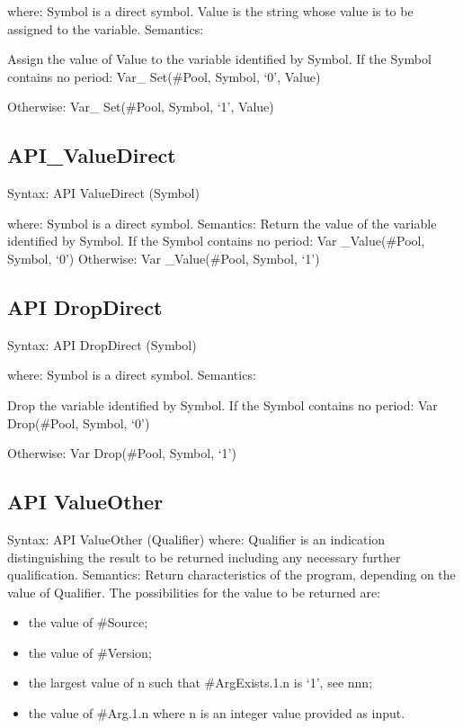 where: Symbol is a direct symbol. Value is the string whose value is to
be assigned to the variable. Semantics:

Assign the value of Value to the variable identified by Symbol. If the
Symbol contains no period: Var\_ Set(\#Pool, Symbol, `0', Value)

Otherwise: Var\_ Set(\#Pool, Symbol, `1', Value)

\hypertarget{api_valuedirect}{%
\subsection{API\_ValueDirect}\label{api_valuedirect}}

Syntax: API ValueDirect (Symbol)

where: Symbol is a direct symbol. Semantics: Return the value of the
variable identified by Symbol. If the Symbol contains no period: Var
\_Value(\#Pool, Symbol, `0') Otherwise: Var \_Value(\#Pool, Symbol, `1')

\hypertarget{api-dropdirect}{%
\subsection{API DropDirect}\label{api-dropdirect}}

Syntax: API DropDirect (Symbol)

where: Symbol is a direct symbol. Semantics:

Drop the variable identified by Symbol. If the Symbol contains no
period: Var Drop(\#Pool, Symbol, `0')

Otherwise: Var Drop(\#Pool, Symbol, `1')

\hypertarget{api-valueother}{%
\subsection{API ValueOther}\label{api-valueother}}

Syntax: API ValueOther (Qualifier) where: Qualifier is an indication
distinguishing the result to be returned including any necessary further
qualification. Semantics: Return characteristics of the program,
depending on the value of Qualifier. The possibilities for the value to
be returned are:

\begin{itemize}
\item
  the value of \#Source;
\item
  the value of \#Version;
\item
  the largest value of n such that \#ArgExists.1.n is `1', see nnn;
\item
  the value of \#Arg.1.n where n is an integer value provided as input.
\end{itemize}

